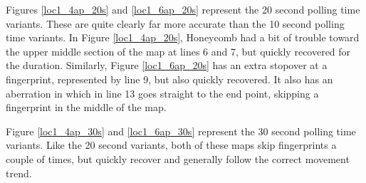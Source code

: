 Figures \ref{loc1_4ap_20s} and \ref{loc1_6ap_20s} represent the 20 second polling time variants. These are quite clearly far more accurate than the 10 second polling time variants. In Figure \ref{loc1_4ap_20s}, Honeycomb had a bit of trouble toward the upper middle section of the map at lines 6 and 7, but quickly recovered for the duration. Similarly, Figure \ref{loc1_6ap_20s} has an extra stopover at a fingerprint, represented by line 9, but also quickly recovered. It also has an aberration in which in line 13 goes straight to the end point, skipping a fingerprint in the middle of the map.

Figure \ref{loc1_4ap_30s} and \ref{loc1_6ap_30s} represent the 30 second polling time variants. Like the 20 second variants, both of these maps skip fingerprints a couple of times, but quickly recover and generally follow the correct movement trend. 